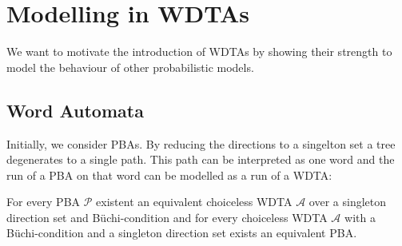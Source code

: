 \section{Modelling in \acp*{WDTA}}
We want to motivate the introduction of \acp{WDTA} by showing their strength to
model the behaviour of other probabilistic models. 
\subsection{Word Automata}
Initially, we consider \acp{PBA}. By reducing the directions to a 
singelton set a tree degenerates to a single path. This path can be interpreted 
as one word and the run of a \ac{PBA} on that word can be modelled as a run of 
a \ac{WDTA}:
\begin{theorem}
  For every \ac{PBA} $\mathcal{P}$ existent an equivalent choiceless \ac{WDTA}
  $\mathcal{A}$ over a singleton direction set and Büchi-condition and for 
  every choiceless \ac{WDTA} $\mathcal{A}$ with a Büchi-condition and a
  singleton direction set exists an equivalent \ac{PBA}.
  \label{thm:pbaaswdta}
\end{theorem}
